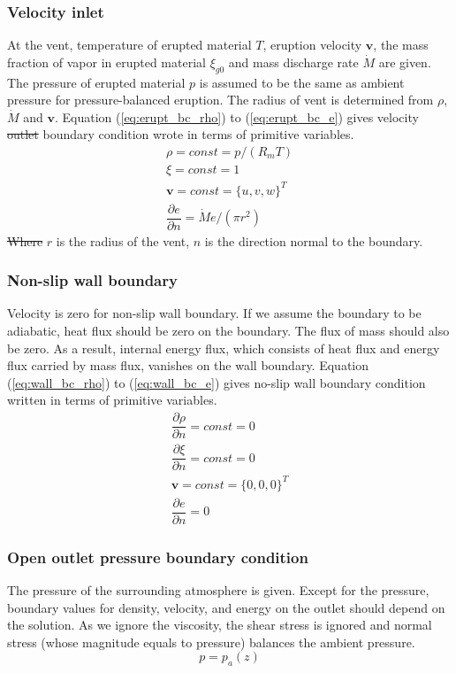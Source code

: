 \documentclass[gmd, manuscript]{copernicus} %
\providecommand{\DIFadd}[1]{{\protect\color{blue}\uwave{#1}}} %
\providecommand{\DIFdel}[1]{{\protect\color{red}\sout{#1}}}                      %
\providecommand{\DIFaddbegin}{} %
\providecommand{\DIFaddend}{} %
\providecommand{\DIFdelbegin}{} %
\providecommand{\DIFdelend}{} %
\begin{document}
\subsubsection{Velocity inlet}
At the vent, temperature of erupted material $T$, eruption velocity $\textbf{v}$, the mass fraction of vapor in erupted material $\xi_{g0}$ and mass discharge rate $\dot M$ are given. The pressure of erupted material $p$ is assumed to be the same as ambient pressure for pressure-balanced eruption. The radius of vent is determined from $\rho$, $\dot M$ and $\textbf{v}$. Equation (\ref{eq:erupt_bc_rho}) to (\ref{eq:erupt_bc_e}) gives velocity \DIFdelbegin \DIFdel{outlet }\DIFdelend \DIFaddbegin \DIFadd{inlet }\DIFaddend boundary condition wrote in terms of primitive variables.
\begin{align}
\rho =const = p/\left(R_m T\right) \label{eq:erupt_bc_rho} \\
\xi=const=1 \label{eq:erupt_bc_xi}\\
\textbf{v} = const =\{u,v,w\}^T \label{eq:erupt_bc_v}\\
\dfrac{\partial e}{\partial n}=\dot M e /\left(\pi r^2\right) \label{eq:erupt_bc_e}
\end{align} 
\DIFdelbegin \DIFdel{Where }\DIFdelend \DIFaddbegin \DIFadd{where }\DIFaddend $r$ is the radius of the vent, $n$ is the direction normal to the boundary.

\subsubsection{Non-slip wall boundary}
Velocity is zero for non-slip wall boundary. If we assume the boundary to be adiabatic, heat flux should be zero on the boundary. The flux of mass should also be zero. As a result, internal energy flux, which consists of heat flux and energy flux carried by mass flux, vanishes on the wall boundary. Equation (\ref{eq:wall_bc_rho}) to (\ref{eq:wall_bc_e}) gives no-slip wall boundary condition written in terms of primitive variables.
\begin{align}
\dfrac{\partial \rho}{\partial n} = const = 0\label{eq:wall_bc_rho} \\
\dfrac{\partial \xi}{\partial n} = const = 0 \label{eq:wall_bc_xi}\\ 
\textbf{v} = const =\{0,0,0\}^T \label{eq:wall_bc_v}\\
\dfrac{\partial e }{\partial n} = 0\label{eq:wall_bc_e}
\end{align} 

\subsubsection{Open outlet pressure boundary condition}
The pressure of the surrounding atmosphere is given. Except for the pressure, boundary values for density, velocity, and energy on the outlet should depend on the solution. As we ignore the viscosity, the shear stress is ignored and normal stress (whose magnitude equals to pressure) balances the ambient pressure.
\begin{equation}
p = p_a\left(z\right)  \label{eq:pressure_bc_p} 
\end{equation} 
\end{document}
